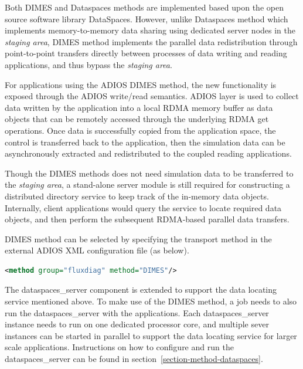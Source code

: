 Both DIMES and Dataspaces methods are implemented based upon the open source 
software library DataSpaces. However, unlike Dataspaces method which implements 
memory-to-memory data sharing using dedicated server nodes in the \emph{staging 
area}, DIMES method implements the parallel data redistribution through point-to-point 
transfers directly between processes of data writing and reading applications, and thus 
bypass the \emph{staging area}. 

For applications using the ADIOS DIMES method, the new functionality is exposed 
through the ADIOS write/read semantics. ADIOS layer is used to collect data written by 
the application into a local RDMA memory buffer as data objects that can 
be remotely accessed through the underlying RDMA get operations. Once data is 
successfully copied from the application space, the control is transferred back to the 
application, then the simulation data can be asynchronously extracted and redistributed 
to the coupled reading applications. 

Though the DIMES methods does not need simulation data to be transferred to the 
\emph{staging area}, a stand-alone server module is still required for constructing a 
distributed directory service to keep track of the in-memory data objects. Internally, client 
applications would query the service to locate required data objects, and then perform 
the subsequent RDMA-based parallel data transfers. 

DIMES method can be selected by specifying the transport method in the external 
ADIOS XML configuration file (as below).

\begin{lstlisting}[language=XML, caption=Select DIMES as a transport method in the configuration file example.]
<method group="fluxdiag" method="DIMES"/>
\end{lstlisting}

The dataspaces\_server component is extended to support the data locating service 
mentioned above. To make use of the DIMES method, a job needs to also run the 
dataspaces\_server with the applications. Each dataspaces\_server instance 
needs to run on one dedicated processor core, and multiple sever instances can be 
started in parallel to support the data locating service for larger scale applications. 
Instructions on how to configure and run the dataspaces\_server can be found in 
section~\ref{section-method-dataspaces}.


